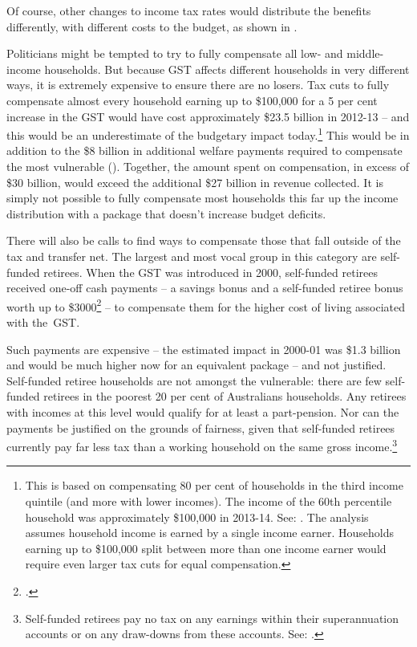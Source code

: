 Of course, other changes to income tax rates would distribute the benefits differently, with different costs to the budget, as shown in . 

Politicians might be tempted to try to fully compensate all low- and middle-income households. But because GST affects different households in very different ways, it is extremely expensive to ensure there are no losers. Tax cuts to fully compensate almost every household earning up to \$100,000 for a 5 per cent increase in the GST would have cost approximately \$23.5 billion in 2012-13 – and this would be an underestimate of the budgetary impact today.\footnote{This is based on compensating 80 per cent of households in the third income quintile (and more with lower incomes). The income of the 60th percentile household was approximately \$100,000 in 2013-14. See: \textcite{ABS2015HouseholdIncomeWealth1314}. The analysis assumes household income is earned by a single income earner. Households earning up to \$100,000 split between more than one income earner would require even larger tax cuts for equal compensation.}  This would be in addition to the \$8 billion in additional welfare payments required to compensate the most vulnerable (). Together, the amount spent on compensation, in excess of \$30 billion, would exceed the additional \$27 billion in revenue collected. It is simply not possible to fully compensate most households this far up the income distribution with a package that doesn’t increase budget deficits.

There will also be calls to find ways to compensate those that fall outside of the tax and transfer net. The largest and most vocal group in this category are self-funded retirees. When the GST was introduced in 2000, self-funded retirees received one-off cash payments – a savings bonus and a self-funded retiree bonus worth up to \$3000\footcite{GST-Act-Bonuses-for-Older-Australians-1999}  – to compensate them for the higher cost of living associated with the~GST. 

Such payments are expensive – the estimated impact in 2000-01 was \$1.3 billion and would be much higher now for an equivalent package – and not justified. Self-funded retiree households are not amongst the vulnerable: there are few self-funded retirees in the poorest 20 per cent of Australians households. Any retirees with incomes at this level would qualify for at least a part-pension. Nor can the payments be justified on the grounds of fairness, given that self-funded retirees currently pay far less tax than a working household on the same gross income.\footnote{Self-funded retirees pay no tax on any earnings within their superannuation accounts or on any draw-downs from these accounts. See: .}  

